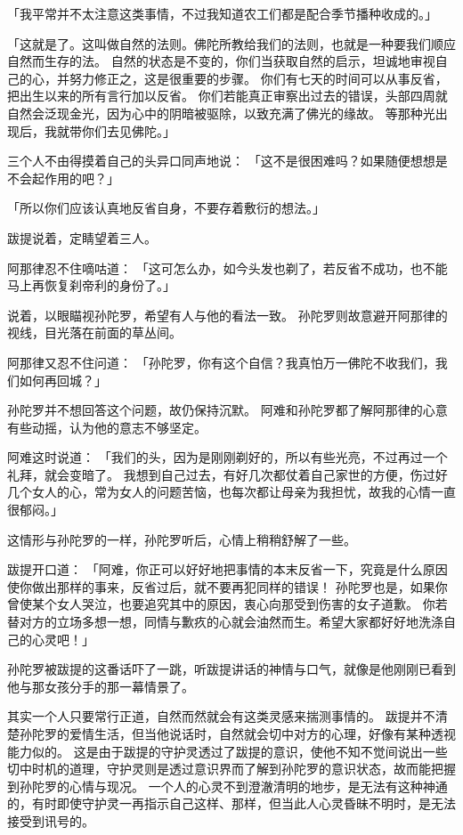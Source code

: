 \documentclass[twoside,openany]{book}
\begin{document}
「我平常并不太注意这类事情，不过我知道农工们都是配合季节播种收成的。」

「这就是了。这叫做自然的法则。佛陀所教给我们的法则，也就是一种要我们顺应自然而生存的法。
自然的状态是不变的，你们当获取自然的启示，坦诚地审视自己的心，并努力修正之，这是很重要的步骤。
你们有七天的时间可以从事反省，把出生以来的所有言行加以反省。
你们若能真正审察出过去的错误，头部四周就自然会泛现金光，因为心中的阴暗被驱除，以致充满了佛光的缘故。
等那种光出现后，我就带你们去见佛陀。」

三个人不由得摸着自己的头异口同声地说：
「这不是很困难吗？如果随便想想是不会起作用的吧？」

「所以你们应该认真地反省自身，不要存着敷衍的想法。」

跋提说着，定睛望着三人。

阿那律忍不住嘀咕道：
「这可怎么办，如今头发也剃了，若反省不成功，也不能马上再恢复刹帝利的身份了。」

说着，以眼瞄视孙陀罗，希望有人与他的看法一致。
孙陀罗则故意避开阿那律的视线，目光落在前面的草丛间。

阿那律又忍不住问道：
「孙陀罗，你有这个自信？我真怕万一佛陀不收我们，我们如何再回城？」

孙陀罗并不想回答这个问题，故仍保持沉默。
阿难和孙陀罗都了解阿那律的心意有些动摇，认为他的意志不够坚定。

阿难这时说道：
「我们的头，因为是刚刚剃好的，所以有些光亮，不过再过一个礼拜，就会变暗了。
我想到自己过去，有好几次都仗着自己家世的方便，伤过好几个女人的心，常为女人的问题苦恼，也每次都让母亲为我担忧，故我的心情一直很郁闷。」

这情形与孙陀罗的一样，孙陀罗听后，心情上稍稍舒解了一些。

跋提开口道：
「阿难，你正可以好好地把事情的本末反省一下，究竟是什么原因使你做出那样的事来，反省过后，就不要再犯同样的错误！
孙陀罗也是，如果你曾使某个女人哭泣，也要追究其中的原因，衷心向那受到伤害的女子道歉。
你若替对方的立场多想一想，同情与歉疚的心就会油然而生。希望大家都好好地洗涤自己的心灵吧！」

孙陀罗被跋提的这番话吓了一跳，听跋提讲话的神情与口气，就像是他刚刚已看到他与那女孩分手的那一幕情景了。

其实一个人只要常行正道，自然而然就会有这类灵感来揣测事情的。
跋提并不清楚孙陀罗的爱情生活，但当他说话时，自然就会切中对方的心理，好像有某种透视能力似的。
这是由于跋提的守护灵透过了跋提的意识，使他不知不觉间说出一些切中时机的道理，守护灵则是透过意识界而了解到孙陀罗的意识状态，故而能把握到孙陀罗的心情与现况。
一个人的心灵不到澄澈清明的地步，是无法有这种神通的，有时即使守护灵一再指示自己这样、那样，但当此人心灵昏昧不明时，是无法接受到讯号的。
\end{document}
